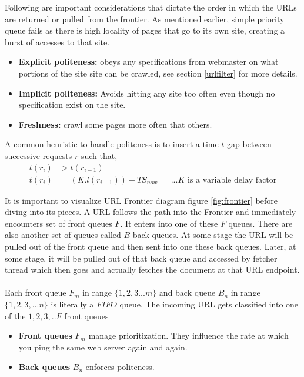 \pagebreak

\noindent
Following are important considerations that dictate the order in which the URLs are returned or pulled from
the frontier. As mentioned earlier, simple priority queue fails as there is high locality of pages that go
to its own site, creating a burst of accesses to that site.

\begin{itemize}
\item \textbf{Explicit politeness:} obeys any specifications from webmaster on what portions of the site
  site can be crawled, see section \ref{urlfilter} for more details.
\item \textbf{Implicit politeness:} Avoids hitting any site too often even though no specification exist
  on the site.
  \item \textbf{Freshness:} crawl some pages more often that others.
\end{itemize}

\noindent
A common heuristic to handle politeness is to insert a time $t$ gap between successive requests $r$ such
that,
\begin{align*}
  t(r_i) &> t(r_{i-1}) \\
  t(r_i) &= (K.l(r_{i-1})) + TS_{now} && \text{...$K$ is a variable delay factor}
\end{align*}

\noindent
It is important to visualize URL Frontier diagram figure \ref{fig:frontier} before diving into its pieces. A URL follows the path into the Frontier and immediately encounters set of front queues $F$. It enters into one of these $F$ queues. There are also another set of queues called $B$ back queues. At some stage the URL will be pulled out of the front queue and then sent into one these back queues. Later, at some stage, it will be pulled out of that back queue and accessed by fetcher thread which then goes and actually fetches
the document at that URL endpoint.
\\
\\
\noindent
Each front queue $F_m$ in range $\{1,2,3...m\}$  and back queue $B_n$ in range $\{1,2,3,...n\}$ is literally a $FIFO$ queue. The incoming URL gets classified into one of the ${1,2,3,..F}$ front queues

\begin{itemize}
\item \textbf{Front queues} $F_m$ manage prioritization. They influence the rate at which you ping the
  same web server again and again.
  \item \textbf{Back queues} $B_n$ enforces politeness.
\end{itemize}

